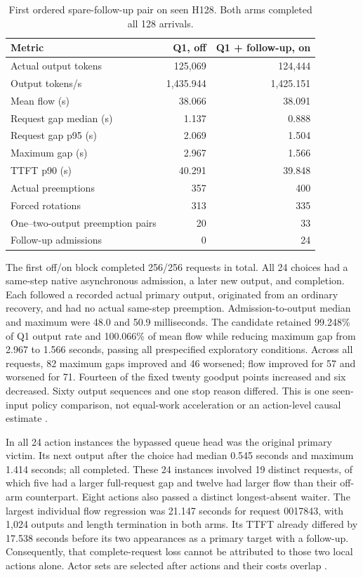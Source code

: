 \documentclass[10pt]{article}
\begin{document}
\begin{table}[t]
\centering
\caption{First ordered spare-follow-up pair on seen H128. Both arms completed all 128 arrivals.}
\label{tab:sparepair}
\begin{tabular}{lrr}
\toprule
Metric & Q1, off & Q1 + follow-up, on \\
\midrule
Actual output tokens & 125,069 & 124,444 \\
Output tokens/s & 1,435.944 & 1,425.151 \\
Mean flow (s) & 38.066 & 38.091 \\
Request gap median (s) & 1.137 & 0.888 \\
Request gap p95 (s) & 2.069 & 1.504 \\
Maximum gap (s) & 2.967 & 1.566 \\
TTFT p90 (s) & 40.291 & 39.848 \\
Actual preemptions & 357 & 400 \\
Forced rotations & 313 & 335 \\
One--two-output preemption pairs & 20 & 33 \\
Follow-up admissions & 0 & 24 \\
\bottomrule
\end{tabular}
\end{table}

The first off/on block completed 256/256 requests in total. All 24 choices had a same-step native asynchronous admission, a later new output, and completion. Each followed a recorded actual primary output, originated from an ordinary recovery, and had no actual same-step preemption. Admission-to-output median and maximum were 48.0 and 50.9 milliseconds. The candidate retained 99.248\% of Q1 output rate and 100.066\% of mean flow while reducing maximum gap from 2.967 to 1.566 seconds, passing all prespecified exploratory conditions. Across all requests, 82 maximum gaps improved and 46 worsened; flow improved for 57 and worsened for 71. Fourteen of the fixed twenty goodput points increased and six decreased. Sixty output sequences and one stop reason differed. This is one seen-input policy comparison, not equal-work acceleration or an action-level causal estimate \cite{sparepair}.

In all 24 action instances the bypassed queue head was the original primary victim. Its next output after the choice had median 0.545 seconds and maximum 1.414 seconds; all completed. These 24 instances involved 19 distinct requests, of which five had a larger full-request gap and twelve had larger flow than their off-arm counterpart. Eight actions also passed a distinct longest-absent waiter. The largest individual flow regression was 21.147 seconds for request 0017843, with 1,024 outputs and length termination in both arms. Its TTFT already differed by 17.538 seconds before its two appearances as a primary target with a follow-up. Consequently, that complete-request loss cannot be attributed to those two local actions alone. Actor sets are selected after actions and their costs overlap \cite{sparepeer}.
\end{document}
